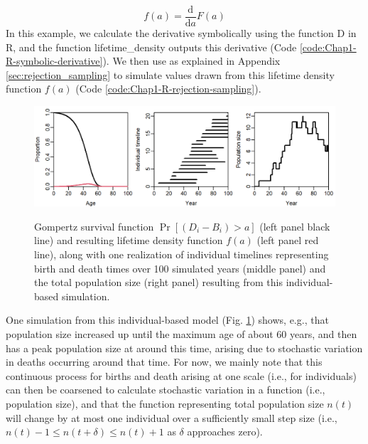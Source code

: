 \begin{equation} \label{eq:Chap1_f}
  f(a) = \frac{\text{d}}{\text{d}a} F(a)    
\end{equation}
In this example, we calculate the derivative symbolically using the function \colorbox{backcolour}{D} in R, and the function \colorbox{backcolour}{lifetime\_density} outputs this derivative (Code \ref{code:Chap1-R-symbolic-derivative}). We then use  as explained in Appendix \ref{sec:rejection_sampling} to simulate values drawn from this lifetime density function \( f(a) \) (Code \ref{code:Chap1-R-rejection-sampling}).  

\lstset{style=Rcode}


\lstset{style=Rcode}


\begin{figure}[!ht]
    \caption[Individual-based model of births and deaths]{Gompertz survival function \(\Pr[(D_i-B_i) > a]\) (left panel black line) and resulting lifetime density function \(f(a)\) (left panel red line), along with one realization of individual timelines representing birth and death times over 100 simulated years (middle panel) and the total population size (right panel) resulting from this individual-based simulation.}
    \centering
    \includegraphics[width=5.5in]{Chap_1/Gompertz_survival.png}
    \label{fig:Chap1_gompertz}
\end{figure}

One simulation from this individual-based model (Fig. \ref{fig:Chap1_gompertz}) shows, e.g., that population size increased up until the maximum age of about 60 years, and then has a peak population size at around this time, arising due to stochastic variation in deaths occurring around that time. For now, we mainly note that this continuous process for births and death arising at one scale (i.e., for individuals) can then be coarsened to calculate stochastic variation in a function (i.e., population size), and that the function representing total population size \(n(t)\) will change by at most one individual over a sufficiently small step size (i.e., \(n(t)-1 \leq n(t+\delta) \leq n(t) + 1 \) as \(\delta\) approaches zero).  

